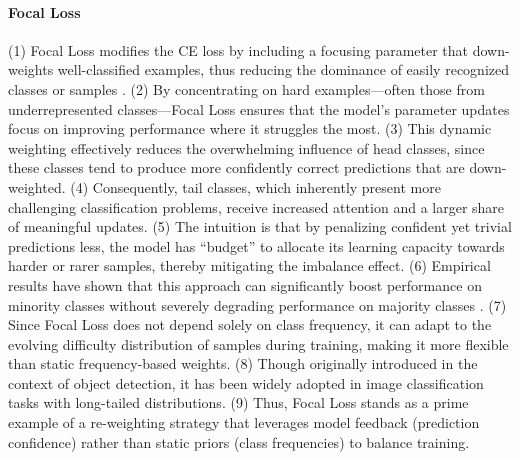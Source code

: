 \paragraph{Focal Loss}
(1) Focal Loss modifies the CE loss by including a focusing parameter that down-weights well-classified examples, thus reducing the dominance of easily recognized classes or samples \cite{lin2018focallossdenseobject}.
(2) By concentrating on hard examples—often those from underrepresented classes—Focal Loss ensures that the model’s parameter updates focus on improving performance where it struggles the most.
(3) This dynamic weighting effectively reduces the overwhelming influence of head classes, since these classes tend to produce more confidently correct predictions that are down-weighted.
(4) Consequently, tail classes, which inherently present more challenging classification problems, receive increased attention and a larger share of meaningful updates.
(5) The intuition is that by penalizing confident yet trivial predictions less, the model has “budget” to allocate its learning capacity towards harder or rarer samples, thereby mitigating the imbalance effect.
(6) Empirical results have shown that this approach can significantly boost performance on minority classes without severely degrading performance on majority classes \cite{zhang2023deep}.
(7) Since Focal Loss does not depend solely on class frequency, it can adapt to the evolving difficulty distribution of samples during training, making it more flexible than static frequency-based weights.
(8) Though originally introduced in the context of object detection, it has been widely adopted in image classification tasks with long-tailed distributions.
(9) Thus, Focal Loss stands as a prime example of a re-weighting strategy that leverages model feedback (prediction confidence) rather than static priors (class frequencies) to balance training.

